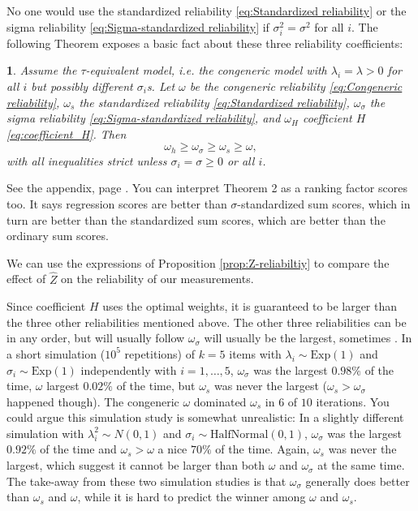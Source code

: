 \documentclass{article}
\makeatletter
\theoremstyle{plain}
\theoremstyle{plain}
\theoremstyle{definition}
\theoremstyle{remark}
\theoremstyle{definition}
\theoremstyle{plain}
\theoremstyle{plain}
\newtheorem{prop}[thm]{\protect\propositionname}
\theoremstyle{definition}
\newenvironment{proof}[1][\protect\proofname]{\par
	\normalfont\topsep6\p@\@plus6\p@\relax
	\trivlist
	\itemindent\parindent
	\item[\hskip\labelsep\scshape #1]\ignorespaces
}{%
	\endtrivlist\@endpefalse
}
\providecommand{\proofname}{Proof}
\providecommand{\propositionname}{Proposition}
\makeatother
\begin{document}
No one would use the standardized reliability \eqref{eq:Standardized reliability}
or the sigma reliability \eqref{eq:Sigma-standardized reliability}
if $\sigma_{i}^{2}=\sigma^{2}$ for all $i$. The following Theorem
exposes a basic fact about these three reliability coefficients:
\begin{prop}
\label{prop:Properties of three} Assume the $\tau$-equivalent model,
i.e. the congeneric model with $\lambda_{i}=\lambda>0$ for all $i$
but possibly different $\sigma_{i}$s. Let $\omega$ be the congeneric
reliability \eqref{eq:Congeneric reliability}, $\omega_{s}$ the standardized reliability \eqref{eq:Standardized reliability},
$\omega_{\sigma}$ the sigma reliability \eqref{eq:Sigma-standardized reliability},
and $\omega_{H}$ coefficient $H$ \eqref{eq:coefficient_H}. Then
\[
\omega_{h}\geq\omega_{\sigma}\geq\omega_{s}\geq\omega,
\]
with all inequalities strict unless $\sigma_{i}=\sigma\geq0$ or all
$i$.
\end{prop}
\begin{proof}
See the appendix, page \pageref{proof:Properties}.
\end{proof}
You can interpret Theorem 2 as a ranking factor scores too. It says
regression scores are better than $\sigma$-standardized sum scores,
which in turn are better than the standardized sum scores, which are
better than the ordinary sum scores.

We can use the expressions of Proposition \ref{prop:Z-reliabiltiy}
to compare the effect of $\widehat{Z}$ on the reliability of our
measurements.

Since coefficient $H$ uses the optimal weights, it is guaranteed to
be larger than the three other reliabilities mentioned above. The
other three reliabilities can be in any order, but will usually follow
$\omega_{\sigma}$ will usually be the largest, sometimes . In a short
simulation ($10^{5}$ repetitions) of $k=5$ items with $\lambda_{i}\sim \textrm{Exp}(1)$
and $\sigma_{i}\sim \textrm{Exp}(1)$ independently with $i=1,\ldots,5$, $\omega_{\sigma}$
was the largest $0.98\%$ of the time, $\omega$ largest $0.02\%$
of the time, but $\omega_{s}$ was never the largest ($\omega_{s}>\omega_{\sigma}$
happened though). The congeneric $\omega$ dominated $\omega_{s}$
in $6$ of $10$ iterations. You could argue this simulation study
is somewhat unrealistic: In a slightly different simulation with $\lambda_{i}^{2}\sim N(0,1)$
and $\sigma_{i}\sim \textrm{HalfNormal}(0,1)$, $\omega_{\sigma}$ was the
largest $0.92\%$ of the time and $\omega_{s}>\omega$ a nice $70\%$
of the time. Again, $\omega_{s}$ was never the largest, which suggest
it cannot be larger than both $\omega$ and $\omega_{\sigma}$ at
the same time. The take-away from these two simulation studies is
that $\omega_{\sigma}$ generally does better than $\omega_{s}$ and
$\omega$, while it is hard to predict the winner among $\omega$
and $\omega_{s}$. 
\end{document}

